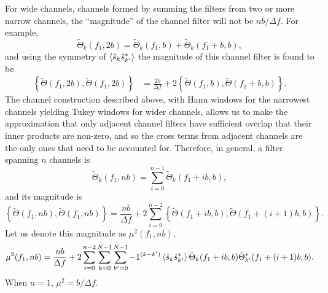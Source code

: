 \documentclass{article}
\begin{document}
For wide channels, channels formed by summing the filters from two or more
narrow channels, the ``magnitude'' of the channel filter will not be \(n b
/ \Delta f\).  For example,
\begin{equation}
\tilde{\Theta}_{k}(f_{1}, 2 b)
   = \tilde{\Theta}_{k}(f_{1}, b) + \tilde{\Theta}_{k}(f_{1} + b, b),
\end{equation}
and using the symmetry of \(\left\langle\hat{s}_{k} \hat{s}^{*}_{k'}\right\rangle\) the
magnitude of this channel filter is found to be
\begin{align}
\left\{ \tilde{\Theta}(f_{1}, 2 b), \tilde{\Theta}(f_{1}, 2 b) \right\}
   & = \frac{2 b}{\Delta f} + 2 \left\{ \tilde{\Theta}(f_{1}, b),
   \tilde{\Theta}(f_{1} + b, b) \right\}.
\end{align}
The channel construction described above, with Hann windows for the
narrowest channels yielding Tukey windows for wider channels, allows us to
make the approximation that only adjacent channel filters have sufficient
overlap that their inner products are non-zero, and so the cross terms from
adjacent channels are the only ones that need to be accounted for.
Therefore, in general, a filter spanning \(n\) channels is
\begin{equation}
\tilde{\Theta}_{k}(f_{1}, n b)
   = \sum_{i = 0}^{n - 1} \tilde{\Theta}_{k}(f_{1} + i b, b),
\end{equation}
and its magnitude is
\begin{equation}
\left\{ \tilde{\Theta}(f_{1}, n b), \tilde{\Theta}(f_{1}, n b) \right\}
   = \frac{n b}{\Delta f} + 2 \sum_{i = 0}^{n - 2} \left\{
   \tilde{\Theta}(f_{1} + i b, b), \tilde{\Theta}(f_{1} + (i + 1) b, b)
   \right\}.
\end{equation}
Let us denote this magnitude as \(\mu^{2}(f_{1}, n b)\),
\begin{equation}
\label{eqn2}
\mu^{2}(f_{1}, n b)
   = \frac{n b}{\Delta f} + 2 \sum_{i = 0}^{n - 2} \sum_{k = 0}^{N - 1}
   \sum_{k' = 0}^{N - 1} -1^{(k - k')} \left\langle\hat{s}_{k}
   \hat{s}^{*}_{k'}\right\rangle \tilde{\Theta}_{k}(f_{1} + i b, b)
   \tilde{\Theta}^{*}_{k'}(f_{1} + (i + 1) b, b).
\end{equation}
When \(n = 1\), \(\mu^{2} = b / \Delta f\).
\end{document}
